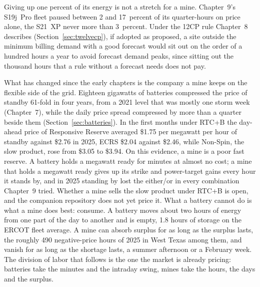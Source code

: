 Giving up one percent of its energy is not a stretch for a mine. Chapter~9's S19j~Pro fleet paused between 2 and 17~percent of its quarter-hours on price alone, the S21~XP never more than 3~percent. Under the 12CP rule Chapter~8 describes (Section~\ref{sec:twelvecp}), if adopted as proposed, a site outside the minimum billing demand with a good forecast would sit out on the order of a hundred hours a year to avoid forecast demand peaks, since sitting out the thousand hours that a rule without a forecast needs does not pay. %

What has changed since the early chapters is the company a mine keeps on the flexible side of the grid. Eighteen gigawatts of batteries compressed the price of standby 61-fold in four years, from a 2021 level that was mostly one storm week (Chapter~7), while the daily price spread compressed by more than a quarter beside them (Section~\ref{sec:batteries}). In the first months under RTC+B the day-ahead price of Responsive Reserve averaged \$1.75 per megawatt per hour of standby against \$2.76 in 2025, ECRS \$2.04 against \$2.46, while Non-Spin, the slow product, rose from \$3.05 to \$3.94. %
On this evidence, a mine is a poor fast reserve. A battery holds a megawatt ready for minutes at almost no cost; a mine that holds a megawatt ready gives up its strike and power-target gains every hour it stands by, and in 2025 standing by lost the either/or in every combination Chapter~9 tried. Whether a mine sells the slow product under RTC+B is open, and the companion repository does not yet price it. What a battery cannot do is what a mine does best: consume. A battery moves about two hours of energy from one part of the day to another and is empty, 1.8 hours of storage on the ERCOT fleet average. A mine can absorb surplus for as long as the surplus lasts, the roughly 490 negative-price hours of 2025 in West Texas among them, and vanish for as long as the shortage lasts, a summer afternoon or a February week. %
The division of labor that follows is the one the market is already pricing: batteries take the minutes and the intraday swing, mines take the hours, the days and the surplus.

